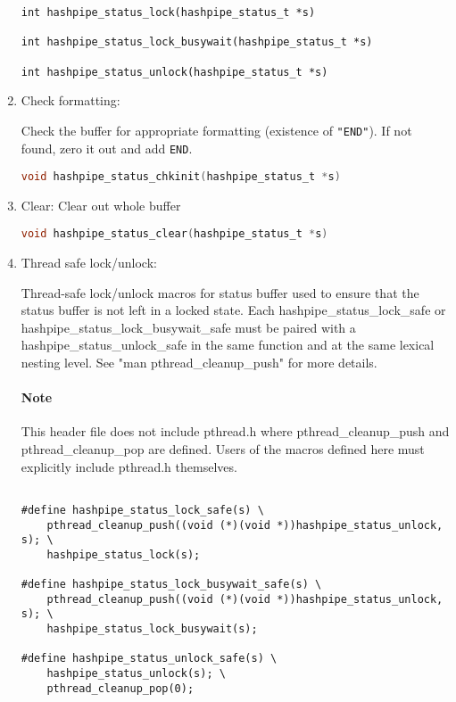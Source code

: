 \documentclass[12pt]{article}
\def\clst{\lstinline[basicstyle=\ttfamily,breaklines=true,language=C]}
\begin{document}
\begin{enumerate}
\begin{centering}
\begin{lstlisting}
int hashpipe_status_lock(hashpipe_status_t *s)

int hashpipe_status_lock_busywait(hashpipe_status_t *s)

int hashpipe_status_unlock(hashpipe_status_t *s)

\end{lstlisting}
\end{centering}

\item Check formatting:

Check the buffer for appropriate formatting (existence of {\tt "END"}).
If not found, zero it out and add {\tt END}.

\clst{void hashpipe_status_chkinit(hashpipe_status_t *s)}

\item Clear: Clear out whole buffer

\clst{void hashpipe_status_clear(hashpipe_status_t *s)}

\item Thread safe lock/unlock:

Thread-safe lock/unlock macros for status buffer used to ensure that the
status buffer is not left in a locked state.  Each hashpipe\_status\_lock\_safe
or hashpipe\_status\_lock\_busywait\_safe must be paired with a
hashpipe\_status\_unlock\_safe in the same function and at the same lexical
nesting level.  See "man pthread\_cleanup\_push" for more details.

\paragraph{Note} This header file does not include pthread.h where pthread\_cleanup\_push
and pthread\_cleanup\_pop are defined.  Users of the macros defined here
must explicitly include pthread.h themselves.

\begin{centering}
\begin{lstlisting}

#define hashpipe_status_lock_safe(s) \
    pthread_cleanup_push((void (*)(void *))hashpipe_status_unlock, s); \
    hashpipe_status_lock(s);

#define hashpipe_status_lock_busywait_safe(s) \
    pthread_cleanup_push((void (*)(void *))hashpipe_status_unlock, s); \
    hashpipe_status_lock_busywait(s);

#define hashpipe_status_unlock_safe(s) \
    hashpipe_status_unlock(s); \
    pthread_cleanup_pop(0);
\end{lstlisting}
\end{centering}

\end{enumerate}
\newpage
\end{document}
